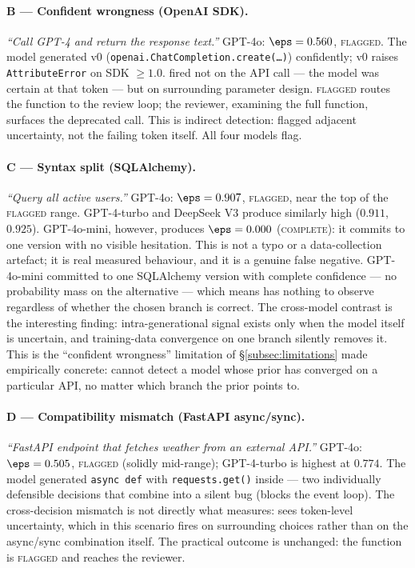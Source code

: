 \paragraph{B --- Confident wrongness (OpenAI SDK).}
\textit{``Call GPT-4 and return the response text.''} GPT-4o: $\eps
= 0.560$, \textsc{flagged}. The model generated v0
(\texttt{openai.ChatCompletion.create(\ldots)}) confidently; v0
raises \texttt{AttributeError} on SDK $\ge 1.0$. \eps fired not on
the API call --- the model was certain at that token --- but on
surrounding parameter design. \textsc{flagged} routes the function
to the review loop; the reviewer, examining the full function,
surfaces the deprecated call. This is indirect detection: \eps
flagged adjacent uncertainty, not the failing token itself. All
four models flag.

\paragraph{C --- Syntax split (SQLAlchemy).}
\textit{``Query all active users.''} GPT-4o: $\eps = 0.907$,
\textsc{flagged}, near the top of the \textsc{flagged} range.
GPT-4-turbo and DeepSeek V3 produce similarly high \eps ($0.911$,
$0.925$). GPT-4o-mini, however, produces $\eps = 0.000$
(\textsc{complete}): it commits to one version with no visible
hesitation. This is not a typo or a data-collection artefact; it is
real measured behaviour, and it is a genuine false negative.
GPT-4o-mini committed to one SQLAlchemy version with complete
confidence --- no probability mass on the alternative --- which
means \eps has nothing to observe regardless of whether the chosen
branch is correct. The cross-model contrast is the interesting
finding: intra-generational signal exists only when the model itself
is uncertain, and training-data convergence on one branch silently
removes it. This is the ``confident wrongness'' limitation of
\S\ref{subsec:limitations} made empirically concrete: \eps cannot
detect a model whose prior has converged on a particular API, no
matter which branch the prior points to.

\paragraph{D --- Compatibility mismatch (FastAPI async/sync).}
\textit{``FastAPI endpoint that fetches weather from an external
API.''} GPT-4o: $\eps = 0.505$, \textsc{flagged} (solidly mid-range);
GPT-4-turbo is highest at $0.774$. The model generated
\texttt{async def} with \texttt{requests.get()} inside --- two
individually defensible decisions that combine into a silent bug
(blocks the event loop). The cross-decision mismatch is not
directly what \eps measures: \eps sees token-level uncertainty,
which in this scenario fires on surrounding choices rather than on
the async/sync combination itself. The practical outcome is
unchanged: the function is \textsc{flagged} and reaches the reviewer.

